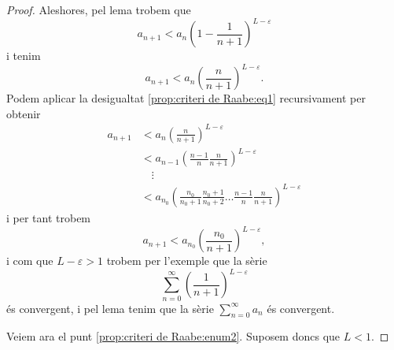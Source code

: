 \documentclass[../Apunts.tex]{subfiles}
\begin{document}
\begin{proposition}
\begin{proof}
			Aleshores, pel lema  trobem que
			\[a_{n+1}<a_{n}\left(1-\frac{1}{n+1}\right)^{L-\varepsilon}\]
			i tenim
			\begin{equation}
				\label{prop:criteri de Raabe:eq1}
				a_{n+1}<a_{n}\left(\frac{n}{n+1}\right)^{L-\varepsilon}.
			\end{equation}
			Podem aplicar la desigualtat \eqref{prop:criteri de Raabe:eq1} recursivament per obtenir
			\begin{align*}
				a_{n+1}&<a_{n}\left(\frac{n}{n+1}\right)^{L-\varepsilon}\\
				&<a_{n-1}\left(\frac{n-1}{n}\frac{n}{n+1}\right)^{L-\varepsilon}\\
				&\quad\vdots\\
				&<a_{n_{0}}\left(\frac{n_{0}}{n_{0}+1}\frac{n_{0}+1}{n_{0}+2}\dots\frac{n-1}{n}\frac{n}{n+1}\right)^{L-\varepsilon}
			\end{align*}
			i per tant trobem
			\[a_{n+1}<a_{n_{0}}\left(\frac{n_{0}}{n+1}\right)^{L-\varepsilon},\]
			i com que \(L-\varepsilon>1\) trobem per l'exemple  que la sèrie
			\[\sum_{n=0}^{\infty}\left(\frac{1}{n+1}\right)^{L-\varepsilon}\]
			és convergent, i pel lema  tenim que la sèrie \(\sum_{n=0}^{\infty}a_{n}\) és convergent.
			
			Veiem ara el punt \eqref{prop:criteri de Raabe:enum2}. Suposem doncs que \(L<1\).
		\end{proof}
	\end{proposition}
\end{document}
